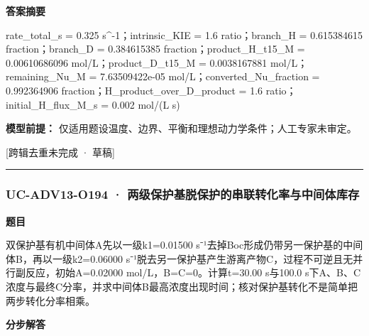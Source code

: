 \documentclass[UTF8,11pt,a4paper]{ctexart}
\begin{document}
\noindent\textbf{答案摘要}\par
rate\_total\_s = 0.325 s\textasciicircum{}-1；intrinsic\_KIE = 1.6 ratio；branch\_H = 0.615384615 fraction；branch\_D = 0.384615385 fraction；product\_H\_t15\_M = 0.00610686096 mol/L；product\_D\_t15\_M = 0.0038167881 mol/L；remaining\_Nu\_M = 7.63509422e-05 mol/L；converted\_Nu\_fraction = 0.992364906 fraction；H\_product\_over\_D\_product = 1.6 ratio；initial\_H\_flux\_M\_s = 0.002 mol/(L s)\par
\noindent\textbf{模型前提：}
仅适用题设温度、边界、平衡和理想动力学条件；人工专家未审定。\par
\noindent\textcolor{red!65!black}{[跨辑去重未完成 · 草稿]} \par
\medskip\hrule\medskip
{}
\subsubsection*{UC-ADV13-O194 · 两级保护基脱保护的串联转化率与中间体库存}
\noindent\textbf{题目}\par
双保护基有机中间体A先以一级k1=0.01500 s⁻¹去掉Boc形成仍带另一保护基的中间体B，再以一级k2=0.06000 s⁻¹脱去另一保护基产生游离产物C，过程不可逆且无并行副反应，初始A=0.02000 mol/L，B=C=0。计算t=30.00 s与100.0 s下A、B、C浓度与最终C分率，并求中间体B最高浓度出现时间；核对保护基转化不是简单把两步转化分率相乘。\par
\medskip\noindent\textbf{分步解答}
\end{document}
